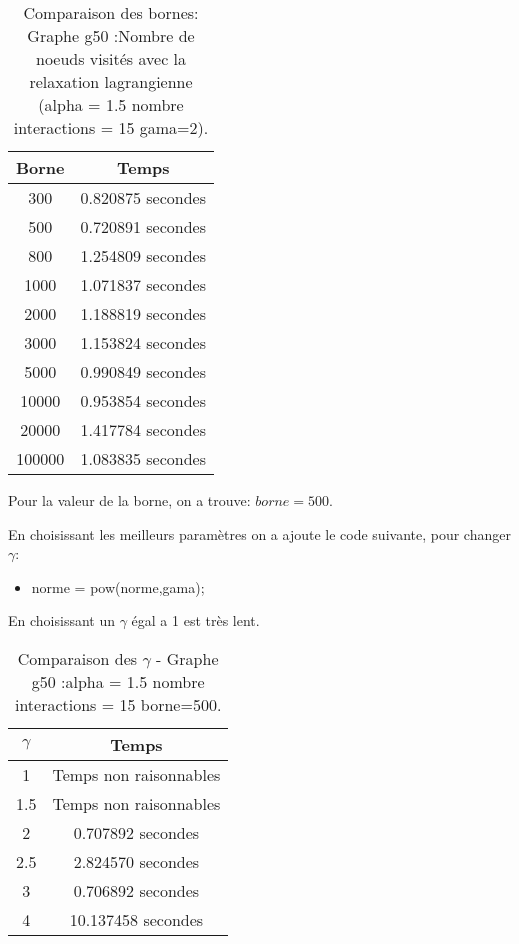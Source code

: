 \documentclass[a4paper,11pt]{article}
\begin{document}
\begin{table}[h!]
\begin{centering}
\begin{tabular}{|c|c|}
\hline 
Borne & Temps\tabularnewline
\hline 
\hline 
300 & 0.820875 secondes\tabularnewline
\hline 
500 & 0.720891 secondes\tabularnewline
\hline 
800 & 1.254809 secondes\tabularnewline
\hline 
1000 & 1.071837 secondes\tabularnewline
\hline 
2000 & 1.188819 secondes\tabularnewline
\hline 
3000 & 1.153824 secondes\tabularnewline
\hline 
5000 & 0.990849 secondes\tabularnewline
\hline 
10000 & 0.953854 secondes\tabularnewline
\hline 
20000 & 1.417784 secondes\tabularnewline
\hline 
100000 & 1.083835 secondes\tabularnewline
\hline 
\end{tabular}
\par\end{centering}

\caption{Comparaison des bornes: Graphe g50 :Nombre de noeuds visités avec
la relaxation lagrangienne (alpha = 1.5 nombre interactions = 15 gama=2). }
\end{table}


Pour la valeur de la borne, on a trouve: $borne = 500$.

En choisissant les meilleurs paramètres on a ajoute le code suivante, pour changer $\gamma$:
\begin{itemize}
\item norme = pow(norme,gama);
\end{itemize}

En choisissant un $\gamma$ égal a 1 est très lent.



\begin{table}[h!]
\begin{centering}
\begin{tabular}{|c|c|}
\hline 
$\gamma$ & Temps\tabularnewline
\hline 
\hline 
1 & Temps non raisonnables\tabularnewline
\hline 
1.5 & Temps non raisonnables\tabularnewline
\hline 
2 & 0.707892 secondes\tabularnewline
\hline 
2.5 & 2.824570 secondes\tabularnewline
\hline 
3 & 0.706892 secondes\tabularnewline
\hline 
4 & 10.137458 secondes\tabularnewline
\hline 
\end{tabular}
\par\end{centering}

\caption{Comparaison des $\gamma$ - Graphe g50 :alpha = 1.5 nombre interactions = 15 borne=500. }
\end{table}
\end{document}

